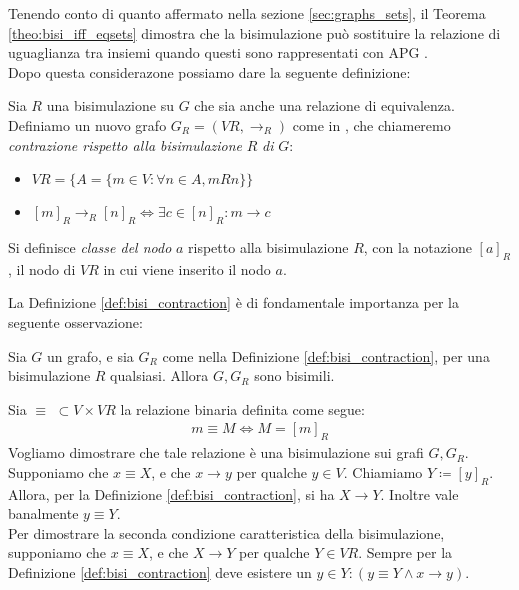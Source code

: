 Tenendo conto di quanto affermato nella sezione \ref*{sec:graphs_sets}, il Teorema \ref*{theo:bisi_iff_eqsets} dimostra che la bisimulazione può sostituire la
relazione di uguaglianza tra insiemi quando questi sono rappresentati con APG \cite{dovier}.\\
Dopo questa considerazone possiamo dare la seguente definizione:
\begin{definition}
    Sia $R$ una bisimulazione su $G$ che sia anche una relazione di equivalenza. Definiamo un nuovo grafo $G_R = (VR, \to_R)$ come in \cite{gentilini}, che chiameremo \emph{contrazione rispetto alla bisimulazione} $R$ \emph{di} $G$:
    \begin{itemize}
        \item $VR = \{A = \{m \in V: \forall n \in A, m R n\}\}$
        \item $[m]_R \to_R [n]_R \iff \exists c \in [n]_R : m \to c$
    \end{itemize}
    Si definisce \emph{classe del nodo} $a$ rispetto alla bisimulazione $R$, con la notazione $[a]_R$, il nodo di $VR$ in cui viene inserito il nodo $a$.
    \label{def:bisi_contraction}
\end{definition}
La Definizione \ref*{def:bisi_contraction} è di fondamentale importanza per la seguente osservazione:
\begin{proposition}
    Sia $G$ un grafo, e sia $G_R$ come nella Definizione \ref*{def:bisi_contraction}, per una bisimulazione $R$ qualsiasi. Allora $G, G_R$ sono bisimili.
    \label{prop:bisi_cont_bisi}
\end{proposition}
\begin{proof2}
    Sia $\equiv \,\,\subset V\times VR$ la relazione binaria definita come segue:
    \begin{gather*}
        m \equiv M \iff M = [m]_R
    \end{gather*}
    Vogliamo dimostrare che tale relazione è una bisimulazione sui grafi $G, G_R$.\\
    Supponiamo che $x \equiv X$, e che $x \to y$ per qualche $y \in V$. Chiamiamo $Y \coloneqq [y]_R$. Allora, per la Definizione \ref*{def:bisi_contraction}, si ha $X \to Y$. Inoltre vale banalmente $y \equiv Y$.\\
    Per dimostrare la seconda condizione caratteristica della bisimulazione, supponiamo che $x \equiv X$, e che $X \to Y$ per qualche $Y \in VR$. Sempre per la Definizione \ref*{def:bisi_contraction} deve esistere un $y \in Y : (y \equiv Y \land x \to y)$.
\end{proof2}
